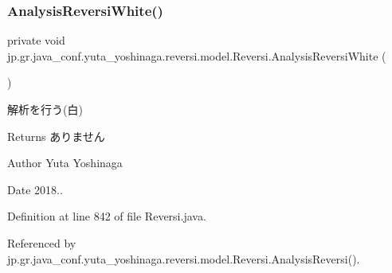 \subsubsection{\texorpdfstring{Analysis\+Reversi\+White()}{AnalysisReversiWhite()}}
{\footnotesize\ttfamily private void jp.\+gr.\+java\+\_\+conf.\+yuta\+\_\+yoshinaga.\+reversi.\+model.\+Reversi.\+Analysis\+Reversi\+White (\begin{DoxyParamCaption}{ }\end{DoxyParamCaption})\hspace{0.3cm}{\ttfamily [private]}}



解析を行う(白) 

\begin{DoxyReturn}{Returns}
ありません 
\end{DoxyReturn}
\begin{DoxyAuthor}{Author}
Yuta Yoshinaga 
\end{DoxyAuthor}
\begin{DoxyDate}{Date}
2018.. 
\end{DoxyDate}


Definition at line 842 of file Reversi.\+java.



Referenced by jp.\+gr.\+java\+\_\+conf.\+yuta\+\_\+yoshinaga.\+reversi.\+model.\+Reversi.\+Analysis\+Reversi().

